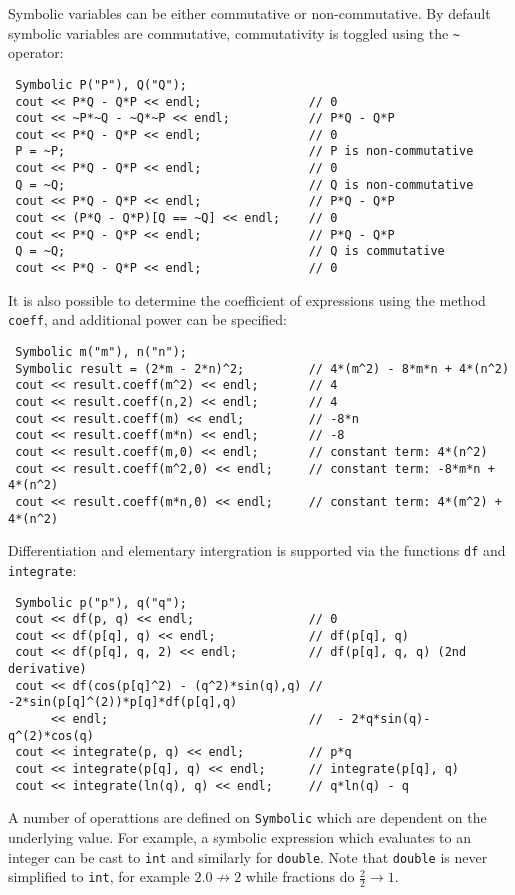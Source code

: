 \documentclass[12pt,a4paper]{report}
\begin{document}
Symbolic variables can be either commutative or non-commutative. By
default symbolic variables are commutative, commutativity is toggled
using the \verb|~| operator:
\begin{verbatim}
 Symbolic P("P"), Q("Q");
 cout << P*Q - Q*P << endl;               // 0
 cout << ~P*~Q - ~Q*~P << endl;           // P*Q - Q*P
 cout << P*Q - Q*P << endl;               // 0
 P = ~P;                                  // P is non-commutative
 cout << P*Q - Q*P << endl;               // 0
 Q = ~Q;                                  // Q is non-commutative
 cout << P*Q - Q*P << endl;               // P*Q - Q*P
 cout << (P*Q - Q*P)[Q == ~Q] << endl;    // 0
 cout << P*Q - Q*P << endl;               // P*Q - Q*P
 Q = ~Q;                                  // Q is commutative
 cout << P*Q - Q*P << endl;               // 0
\end{verbatim}

It is also possible to determine the coefficient of expressions
using the method \verb|coeff|, and additional power can be specified:
\begin{verbatim}
 Symbolic m("m"), n("n");
 Symbolic result = (2*m - 2*n)^2;         // 4*(m^2) - 8*m*n + 4*(n^2)
 cout << result.coeff(m^2) << endl;       // 4
 cout << result.coeff(n,2) << endl;       // 4
 cout << result.coeff(m) << endl;         // -8*n
 cout << result.coeff(m*n) << endl;       // -8
 cout << result.coeff(m,0) << endl;       // constant term: 4*(n^2)         
 cout << result.coeff(m^2,0) << endl;     // constant term: -8*m*n + 4*(n^2)
 cout << result.coeff(m*n,0) << endl;     // constant term: 4*(m^2) + 4*(n^2)
\end{verbatim}

Differentiation and elementary intergration is supported via the
functions \verb|df| and \verb|integrate|:
\begin{verbatim}
 Symbolic p("p"), q("q");
 cout << df(p, q) << endl;                // 0
 cout << df(p[q], q) << endl;             // df(p[q], q)
 cout << df(p[q], q, 2) << endl;          // df(p[q], q, q) (2nd derivative)
 cout << df(cos(p[q]^2) - (q^2)*sin(q),q) // -2*sin(p[q]^(2))*p[q]*df(p[q],q)   
      << endl;                            //  - 2*q*sin(q)-q^(2)*cos(q)
 cout << integrate(p, q) << endl;         // p*q
 cout << integrate(p[q], q) << endl;      // integrate(p[q], q)
 cout << integrate(ln(q), q) << endl;     // q*ln(q) - q
\end{verbatim}

A number of operattions are defined on \verb|Symbolic| which are dependent
on the underlying value. For example, a symbolic expression which evaluates
to an integer can be cast to \verb|int| and similarly for \verb|double|.
Note that \verb|double| is never simplified to \verb|int|, for example
$2.0\not \to 2$ while fractions do $\frac{2}{2}\to 1$.
\end{document}
